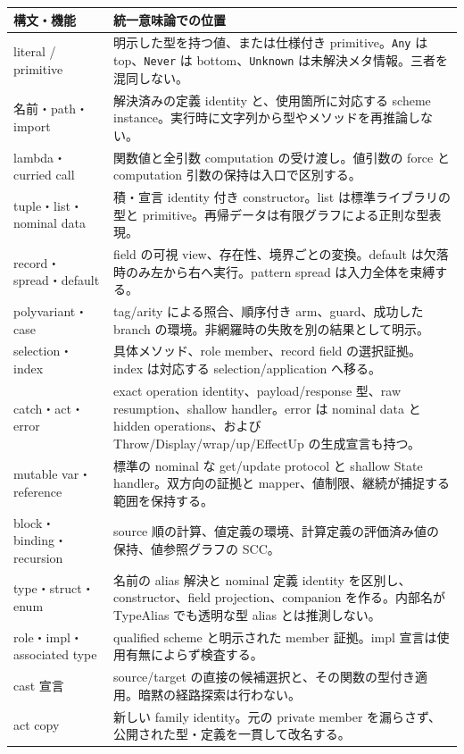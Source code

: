 \documentclass[11pt,a4paper]{article}
\theoremstyle{remark}
\begin{document}
\begin{longtable}{p{}p{}}
\toprule
構文・機能 & 統一意味論での位置 \\
\midrule\endhead
literal / primitive & 明示した型を持つ値、または仕様付き primitive。\texttt{Any} は top、\texttt{Never} は bottom、\texttt{Unknown} は未解決メタ情報。三者を混同しない。\\
名前・path・import & 解決済みの定義 identity と、使用箇所に対応する scheme instance。実行時に文字列から型やメソッドを再推論しない。\\
lambda・curried call & 関数値と全引数 computation の受け渡し。値引数の force と computation 引数の保持は入口で区別する。\\
tuple・list・nominal data & 積・宣言 identity 付き constructor。list は標準ライブラリの型と primitive。再帰データは有限グラフによる正則な型表現。\\
record・spread・default & field の可視 view、存在性、境界ごとの変換。default は欠落時のみ左から右へ実行。pattern spread は入力全体を束縛する。\\
polyvariant・case & tag/arity による照合、順序付き arm、guard、成功した branch の環境。非網羅時の失敗を別の結果として明示。\\
selection・index & 具体メソッド、role member、record field の選択証拠。index は対応する selection/application へ移る。\\
catch・act・error & exact operation identity、payload/response 型、raw resumption、shallow handler。error は nominal data と hidden operations、および Throw/Display/wrap/up/EffectUp の生成宣言も持つ。\\
mutable var・reference & 標準の nominal な get/update protocol と shallow State handler。双方向の証拠と mapper、値制限、継続が捕捉する範囲を保持する。\\
block・binding・recursion & source 順の計算、値定義の環境、計算定義の評価済み値の保持、値参照グラフの SCC。\\
type・struct・enum & 名前の alias 解決と nominal 定義 identity を区別し、constructor、field projection、companion を作る。内部名が TypeAlias でも透明な型 alias とは推測しない。\\
role・impl・associated type & qualified scheme と明示された member 証拠。impl 宣言は使用有無によらず検査する。\\
cast 宣言 & source/target の直接の候補選択と、その関数の型付き適用。暗黙の経路探索は行わない。\\
act copy & 新しい family identity。元の private member を漏らさず、公開された型・定義を一貫して改名する。\\

\end{longtable}
\end{document}
